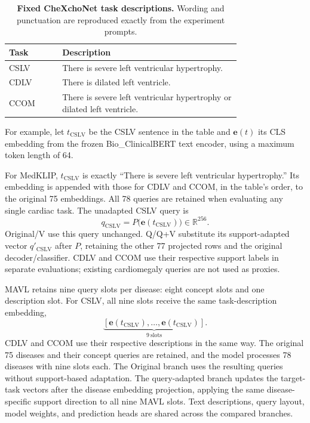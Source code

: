 \begin{table}[t]
\centering
\caption{\textbf{Fixed CheXchoNet task descriptions.} Wording and punctuation are reproduced exactly from the experiment prompts.}
\label{tab:supp-cardiac-prompts}
\footnotesize
\setlength{\tabcolsep}{4pt}
\renewcommand{\arraystretch}{1.15}
\begin{tabular}{@{}lp{0.77\linewidth}@{}}
\toprule
Task & Description \\
\midrule
CSLV & There is severe left ventricular hypertrophy. \\
CDLV & There is dilated left ventricle. \\
CCOM & There is severe left ventricular hypertrophy or dilated left ventricle. \\
\bottomrule
\end{tabular}
\end{table}

For example, let $t_{\mathrm{CSLV}}$ be the CSLV sentence in the table and $\mathbf e(t)$ its CLS embedding from the frozen Bio\_ClinicalBERT text encoder, using a maximum token length of 64.

For MedKLIP, $t_{\mathrm{CSLV}}$ is exactly ``There is severe left ventricular hypertrophy.'' Its embedding is appended with those for CDLV and CCOM, in the table's order, to the original 75 embeddings. All 78 queries are retained when evaluating any single cardiac task. The unadapted CSLV query is
\[
q_{\mathrm{CSLV}}=P\big(\mathbf e(t_{\mathrm{CSLV}})\big)\in\mathbb R^{256}.
\]
Original/V use this query unchanged. Q/Q+V substitute its support-adapted vector $q'_{\mathrm{CSLV}}$ after $P$, retaining the other 77 projected rows and the original decoder/classifier. CDLV and CCOM use their respective support labels in separate evaluations; existing cardiomegaly queries are not used as proxies.

MAVL retains nine query slots per disease: eight concept slots and one description slot. For CSLV, all nine slots receive the same task-description embedding,
\[
\underbrace{[\mathbf e(t_{\mathrm{CSLV}}),\ldots,\mathbf e(t_{\mathrm{CSLV}})]}_{9\ \text{slots}}.
\]
CDLV and CCOM use their respective descriptions in the same way. The original 75 diseases and their concept queries are retained, and the model processes 78 diseases with nine slots each. The Original branch uses the resulting queries without support-based adaptation. The query-adapted branch updates the target-task vectors after the disease embedding projection, applying the same disease-specific support direction to all nine MAVL slots. Text descriptions, query layout, model weights, and prediction heads are shared across the compared branches.

